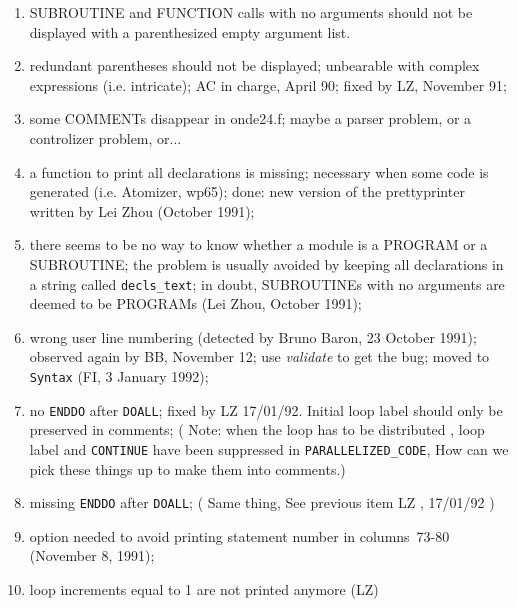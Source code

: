 \begin{enumerate}

  \item SUBROUTINE and FUNCTION calls with no arguments should not be
        displayed with a parenthesized empty argument list.

  \item redundant parentheses should not be displayed; unbearable with
        complex expressions (i.e. intricate); 
        AC in charge, April 90; fixed by LZ, November 91;

  \item some COMMENTs disappear in onde24.f; maybe a parser problem,
        or a controlizer problem, or...

  \item a function to print all declarations is missing; necessary when some
        code is generated (i.e. Atomizer, wp65); done: new version of the
        prettyprinter written by Lei Zhou (October 1991);

  \item there seems to be no way to know whether a module is a PROGRAM
        or a SUBROUTINE; the problem is usually avoided by keeping all
        declarations in a string called \verb+decls_text+; in doubt,
        SUBROUTINEs with no arguments are deemed to be PROGRAMs (Lei Zhou,
        October 1991);

  \item wrong user line numbering (detected by Bruno Baron, 23 October 1991);
        observed again by BB, November 12; use {\em validate} to get
        the bug; moved to \verb+Syntax+ (FI, 3 January 1992);

  \item {}
        no \verb+ENDDO+ after \verb+DOALL+; fixed by LZ 17/01/92. 
        Initial loop label should only be preserved in comments;
        ( Note: when the loop has to be distributed , loop label and
        \verb+CONTINUE+ have been suppressed in 
        \verb+PARALLELIZED_CODE+, How can
        we pick these things up to make them into comments.)

  \item {} missing \verb+ENDDO+ after \verb+DOALL+;
        ( Same thing, See previous item LZ , 17/01/92 )

  \item {} option needed to avoid printing statement number in
        columns~73-80 (November 8, 1991);

  \item loop increments equal to 1 are not printed anymore (LZ)


\end{enumerate}
